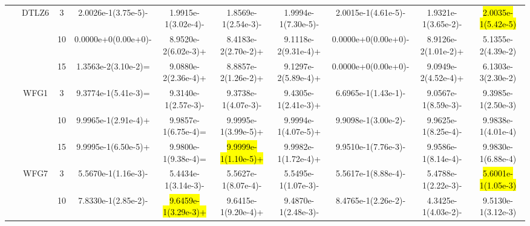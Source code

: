 \documentclass[a4paper,fleqn]{cas-dc}
\newcommand{\highlight}[1]{
	\begingroup
	\sethlcolor{Seashell}%
	\hl{#1}%
	\endgroup
}
\begin{document}
\begin{sloppypar}
\begin{table}[ht]
{\begin{tabular}{cccccccccc}
					
					
					
					
					
					\multirow{9}{*}{~}&\multirow{3}{*}{DTLZ6} &3 &2.0026e-1(3.75e-5)- &1.9915e-1(3.02e-4)-	&1.8569e-1(2.54e-3)-	&1.9994e-1(7.30e-5)-	&2.0015e-1(4.61e-5)-	&1.9321e-1(3.65e-2)-	&\highlight{2.0035e-1(5.42e-5)}\\ 
					
					\multirow{9}{*}{~}&\multirow{3}{*}{~} &10 &0.0000e+0(0.00e+0)- &8.9520e-2(6.02e-3)+	&8.4183e-2(2.70e-2)+	&9.1118e-2(9.31e-4)+	&0.0000e+0(0.00e+0)-	&8.9126e-2(1.01e-2)+	&5.1355e-2(4.39e-2)\\
					
					\multirow{9}{*}{~}&\multirow{3}{*}{~} &15 &1.3563e-2(3.10e-2)=	&9.0880e-2(2.36e-4)+	&8.8857e-2(1.26e-2)+	&9.1297e-2(5.89e-4)+	&0.0000e+0(0.00e+0)-	&9.0949e-2(4.52e-4)+	&6.1303e-3(2.30e-2)\\
					
					
					
					
					\midrule[0.35pt]
					\multirow{9}{*}{Regular}&\multirow{3}{*}{WFG1} &3  &9.3774e-1(5.41e-3)=	&9.3140e-1(2.57e-3)-	&9.3738e-1(4.07e-3)-	&9.4305e-1(2.41e-3)+	&6.6965e-1(1.43e-1)-	&9.0567e-1(8.59e-3)-	&9.3985e-1(2.50e-3)\\ 
					
					\multirow{9}{*}{~}&\multirow{3}{*}{~} &10 &9.9965e-1(2.91e-4)+ &9.9857e-1(6.75e-4)=	&9.9995e-1(3.99e-5)+	&9.9994e-1(4.07e-5)+	&9.9098e-1(3.00e-2)-	&9.9625e-1(8.25e-4)-	&9.9838e-1(4.01e-4)\\
					
					\multirow{9}{*}{~}&\multirow{3}{*}{~} &15 &9.9995e-1(6.50e-5)+ &9.9800e-1(9.38e-4)=	&\highlight{9.9999e-1(1.10e-5)+}	&9.9982e-1(1.72e-4)+	&9.9510e-1(7.76e-3)-	&9.9586e-1(8.14e-4)-	&9.9830e-1(6.88e-4)\\
					
					
					
					
					
					\multirow{9}{*}{~}&\multirow{3}{*}{WFG7} &3 &5.5670e-1(1.16e-3)-	&5.4434e-1(3.14e-3)-	&5.5627e-1(8.07e-4)-	&5.5495e-1(1.07e-3)-	&5.5617e-1(8.88e-4)-	&5.4788e-1(2.22e-3)-	&\highlight{5.6001e-1(1.05e-3)}\\ 
					
					\multirow{9}{*}{~}&\multirow{3}{*}{~} &10 &7.8330e-1(2.85e-2)-	&\highlight{9.6459e-1(3.29e-3)+}	&9.6415e-1(9.20e-4)+	&9.4870e-1(2.48e-3)-	&8.4765e-1(2.26e-2)-	&4.3425e-1(4.03e-2)-	&9.5130e-1(3.12e-3)\\
					

\end{tabular}}
\end{table}
\end{sloppypar}
\end{document}
